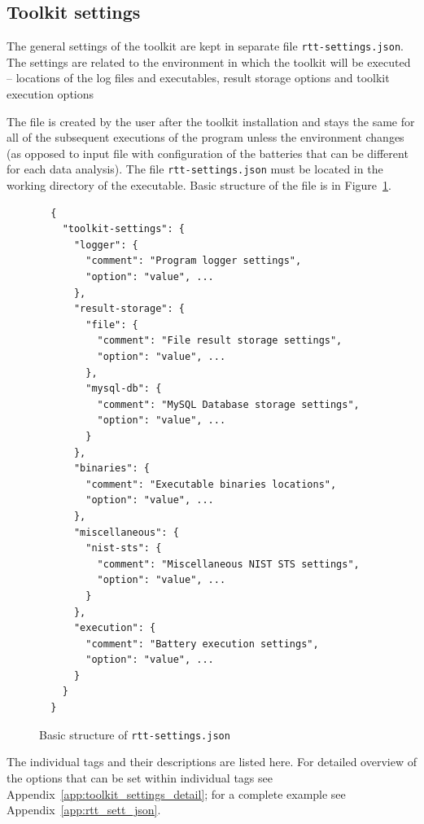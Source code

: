 \documentclass[
	digital,    %
	oneside,    %
	color,
	11pt,
	nocover,
	notable,
	nolof,
	nolot,
]{fithesis3}
\theoremstyle{definition}
\theoremstyle{remark}
\begin{document}
\subsection{Toolkit settings}
The general settings of the toolkit are kept in separate file \texttt{rtt-settings.json}. The settings are related to the environment in which the toolkit will be executed -- locations of the log files and executables, result storage options and toolkit execution options 

The file is created by the user after the toolkit installation and stays the same for all of the subsequent executions of the program unless the environment changes (as opposed to input file with configuration of the batteries that can be different for each data analysis). The file \texttt{rtt-settings.json} must be located in the working directory of the executable. Basic structure of the file is in Figure~\ref{fig:rtt_sett_short_json}.

\begin{figure}[h!]
\begin{verbatim}
  {
    "toolkit-settings": {
      "logger": {
        "comment": "Program logger settings",
        "option": "value", ...
      },
      "result-storage": {
        "file": {
          "comment": "File result storage settings",
          "option": "value", ...
        },
        "mysql-db": {
          "comment": "MySQL Database storage settings",
          "option": "value", ...
        }
      },
      "binaries": {
        "comment": "Executable binaries locations",
        "option": "value", ...
      },    
      "miscellaneous": {
        "nist-sts": {
          "comment": "Miscellaneous NIST STS settings",
          "option": "value", ...
        }
      },
      "execution": {
        "comment": "Battery execution settings",
        "option": "value", ...
      }
    }
  }
\end{verbatim}
\caption{Basic structure of \texttt{rtt-settings.json}}
\label{fig:rtt_sett_short_json}
\end{figure}

The individual tags and their descriptions are listed here. For detailed overview of the options that can be set within individual tags see Appendix~\ref{app:toolkit_settings_detail}; for a complete example see Appendix~\ref{app:rtt_sett_json}. 
\end{document}
